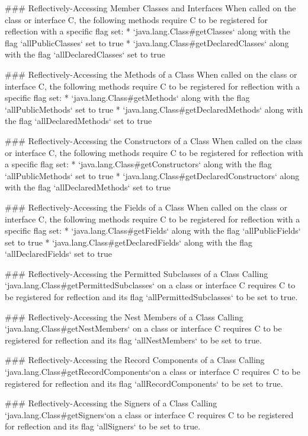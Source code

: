 ### Reflectively-Accessing Member Classes and Interfaces
When called on the class or interface C, the following methods require C to be registered for reflection with
a specific flag set:
* `java.lang.Class#getClasses` along with the flag `allPublicClasses` set to true
* `java.lang.Class#getDeclaredClasses` along with the flag `allDeclaredClasses` set to true

### Reflectively-Accessing the Methods of a Class
When called on the class or interface C, the following methods require C to be registered for reflection with 
a specific flag set:
* `java.lang.Class#getMethods` along with the flag `allPublicMethods` set to true
* `java.lang.Class#getDeclaredMethods` along with the flag `allDeclaredMethods` set to true

### Reflectively-Accessing the Constructors of a Class
When called on the class or interface C, the following methods require C to be registered for reflection with
a specific flag set:
* `java.lang.Class#getConstructors` along with the flag `allPublicMethods` set to true
* `java.lang.Class#getDeclaredConstructors` along with the flag `allDeclaredMethods` set to true

### Reflectively-Accessing the Fields of a Class
When called on the class or interface C, the following methods require C to be registered for reflection with
a specific flag set:
* `java.lang.Class#getFields` along with the flag `allPublicFields` set to true
* `java.lang.Class#getDeclaredFields` along with the flag `allDeclaredFields` set to true

### Reflectively-Accessing the Permitted Subclasses of a Class
Calling `java.lang.Class#getPermittedSubclasses` on a class or interface C requires C to be registered for reflection
and its flag `allPermittedSubclasses` to be set to true.

### Reflectively-Accessing the Nest Members of a Class
Calling `java.lang.Class#getNestMembers` on a class or interface C requires C to be registered for reflection 
and its flag `allNestMembers` to be set to true.

### Reflectively-Accessing the Record Components of a Class
Calling `java.lang.Class#getRecordComponents`on a class or interface C requires C to be registered for reflection
and its flag `allRecordComponents` to be set to true.

### Reflectively-Accessing the Signers of a Class
Calling `java.lang.Class#getSigners`on a class or interface C requires C to be registered for reflection
and its flag `allSigners` to be set to true.

